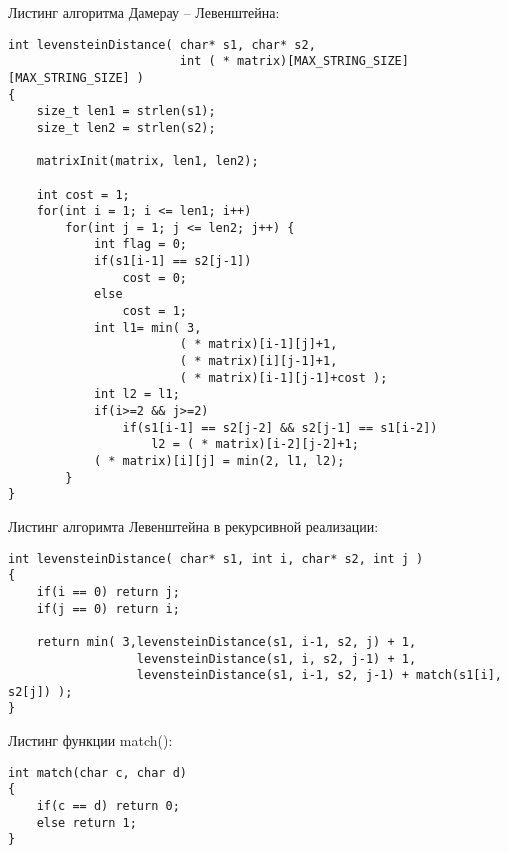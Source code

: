 Листинг алгоритма Дамерау -- Левенштейна:
\begin{lstlisting}[style=CStyle]
int levensteinDistance( char* s1, char* s2,
                        int ( * matrix)[MAX_STRING_SIZE][MAX_STRING_SIZE] )
{
    size_t len1 = strlen(s1);
    size_t len2 = strlen(s2);

    matrixInit(matrix, len1, len2);

    int cost = 1;
    for(int i = 1; i <= len1; i++)
        for(int j = 1; j <= len2; j++) {
            int flag = 0;
            if(s1[i-1] == s2[j-1])
                cost = 0;
            else
                cost = 1;
            int l1= min( 3,
                        ( * matrix)[i-1][j]+1,
                        ( * matrix)[i][j-1]+1,
                        ( * matrix)[i-1][j-1]+cost );
            int l2 = l1;
            if(i>=2 && j>=2)
                if(s1[i-1] == s2[j-2] && s2[j-1] == s1[i-2])
                    l2 = ( * matrix)[i-2][j-2]+1;
            ( * matrix)[i][j] = min(2, l1, l2);
        }
}
\end{lstlisting}

Листинг алгоримта Левенштейна в рекурсивной реализации:
\begin{lstlisting}[style=CStyle]
int levensteinDistance( char* s1, int i, char* s2, int j )
{
    if(i == 0) return j;
    if(j == 0) return i;

    return min( 3,levensteinDistance(s1, i-1, s2, j) + 1,
                  levensteinDistance(s1, i, s2, j-1) + 1,
                  levensteinDistance(s1, i-1, s2, j-1) + match(s1[i], s2[j]) );
}
\end{lstlisting}

Листинг функции match():
\begin{lstlisting}[style=CStyle]
int match(char c, char d)
{
    if(c == d) return 0;
    else return 1;
}
\end{lstlisting}
